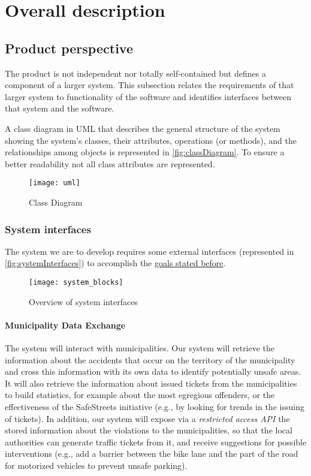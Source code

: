 \section{Overall description}

\subsection{Product perspective}
	
	The product is not independent nor totally self-contained but defines a component of a larger system. This subsection relates the requirements of that larger system to functionality of the software and identifies interfaces between that system and the software. \cite{IeeeRasd}
	
	A class diagram in UML that describes the general structure of the system showing the system's classes, their attributes, operations (or methods), and the relationships among objects is represented in \autoref{fig:classDiagram}. To ensure a better readability not all class attributes are represented.
	
	\begin{figure}[h]
			\centering
			\texttt{[image: uml]}
			\caption{
				\label{fig:classDiagram} 
				Class Diagram
			}
		\end{figure}

	\subsubsection{System interfaces}
	\label{sec:systemInterfaces}
		The system we are to develop requires some external interfaces (represented in \autoref{fig:systemInterfaces}) to accomplish the \hyperref[sec:goals]{goals stated before}.
		\begin{figure}[h]
			\centering
			\texttt{[image: system\_blocks]}
			\caption{
				\label{fig:systemInterfaces} 
				Overview of system interfaces
			}
		\end{figure}
		
\paragraph{Municipality Data Exchange} The system will interact with municipalities. Our system will retrieve the information about the accidents that occur on the territory of the municipality and cross this information with its own data to identify potentially unsafe areas. It will also retrieve the information about issued tickets from the municipalities to build statistics, for example about the most egregious offenders, or the effectiveness of the SafeStreets initiative (e.g., by looking for trends in the issuing of tickets). In addition, our system will expose via a \emph{restricted access API} the stored information about the violations to the municipalities, so that the local authorities can generate traffic tickets from it, and receive suggestions for possible interventions (e.g., add a barrier between the bike lane and the part of the road for motorized vehicles to prevent unsafe parking). 
		
